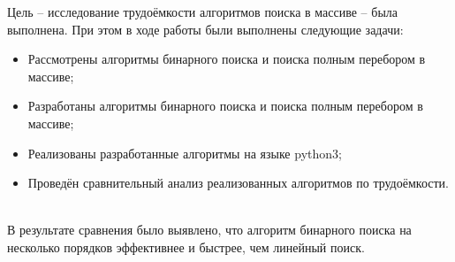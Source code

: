 
Цель – исследование трудоёмкости алгоритмов поиска в массиве – была выполнена.
При этом в ходе работы были выполнены следующие задачи:

\begin{itemize}
	\item Рассмотрены алгоритмы бинарного поиска и поиска полным перебором в массиве;
	\item Разработаны алгоритмы бинарного поиска и поиска полным перебором в массиве; 
	\item Реализованы разработанные алгоритмы на языке python3; 
	\item Проведён сравнительный анализ реализованных алгоритмов по трудоёмкости.
\end{itemize}

~\\

В результате сравнения было выявлено, что алгоритм бинарного поиска на несколько порядков эффективнее и быстрее, чем линейный поиск.